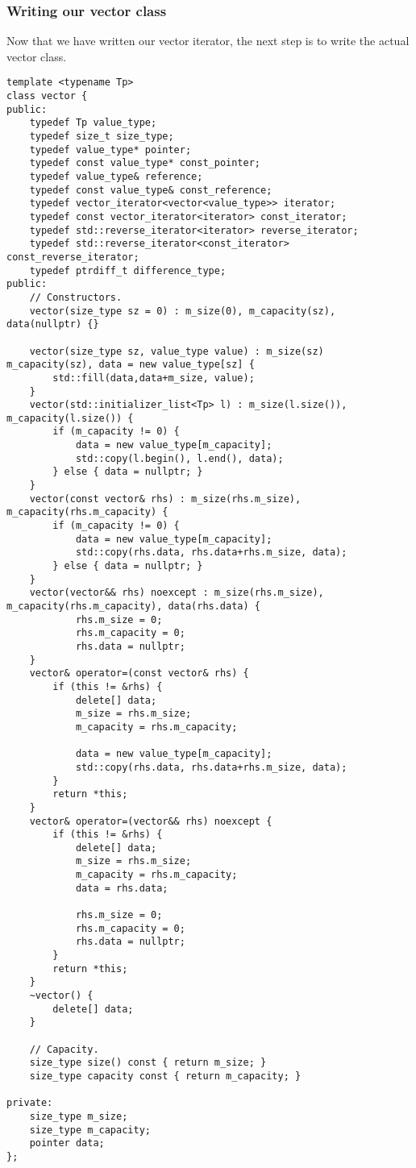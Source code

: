 \documentclass{report}
\begin{document}
\subsubsection{Writing our vector class}
Now that we have written our vector iterator, the next step is to write the actual vector class.
\begin{verbatim}
template <typename Tp>
class vector {
public:
    typedef Tp value_type;
    typedef size_t size_type;
    typedef value_type* pointer;
    typedef const value_type* const_pointer;
    typedef value_type& reference;
    typedef const value_type& const_reference;
    typedef vector_iterator<vector<value_type>> iterator;
    typedef const vector_iterator<iterator> const_iterator;
    typedef std::reverse_iterator<iterator> reverse_iterator;
    typedef std::reverse_iterator<const_iterator> const_reverse_iterator;
    typedef ptrdiff_t difference_type;
public:
    // Constructors.
    vector(size_type sz = 0) : m_size(0), m_capacity(sz), data(nullptr) {}

    vector(size_type sz, value_type value) : m_size(sz) m_capacity(sz), data = new value_type[sz] {
        std::fill(data,data+m_size, value);
    }
    vector(std::initializer_list<Tp> l) : m_size(l.size()), m_capacity(l.size()) {
        if (m_capacity != 0) {
            data = new value_type[m_capacity];
            std::copy(l.begin(), l.end(), data);
        } else { data = nullptr; }
    }
    vector(const vector& rhs) : m_size(rhs.m_size), m_capacity(rhs.m_capacity) {
        if (m_capacity != 0) {
            data = new value_type[m_capacity];
            std::copy(rhs.data, rhs.data+rhs.m_size, data);
        } else { data = nullptr; }
    }
    vector(vector&& rhs) noexcept : m_size(rhs.m_size), m_capacity(rhs.m_capacity), data(rhs.data) {
            rhs.m_size = 0;
            rhs.m_capacity = 0;
            rhs.data = nullptr;
    }
    vector& operator=(const vector& rhs) { 
        if (this != &rhs) {
            delete[] data; 
            m_size = rhs.m_size;
            m_capacity = rhs.m_capacity;
            
            data = new value_type[m_capacity];
            std::copy(rhs.data, rhs.data+rhs.m_size, data);
        } 
        return *this;
    }
    vector& operator=(vector&& rhs) noexcept { 
        if (this != &rhs) {
            delete[] data;
            m_size = rhs.m_size;
            m_capacity = rhs.m_capacity;
            data = rhs.data;

            rhs.m_size = 0;
            rhs.m_capacity = 0;
            rhs.data = nullptr;
        }
        return *this;
    }
    ~vector() {
        delete[] data;
    }
     
    // Capacity.
    size_type size() const { return m_size; }
    size_type capacity const { return m_capacity; }

private:
    size_type m_size;
    size_type m_capacity;
    pointer data;
};
\end{verbatim}
\end{document}
